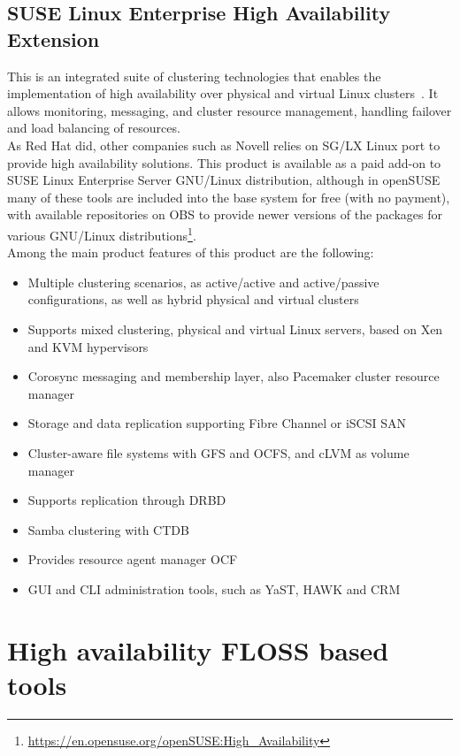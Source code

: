 \documentclass[a4paper, 12pt]{book}
\begin{document}
\subsection{SUSE Linux Enterprise High Availability Extension}
\label{subsec:suseha}

This is an integrated suite of clustering technologies that enables the implementation of high availability over physical and virtual Linux clusters~\cite{Tanja and Schraitle}. It allows monitoring, messaging, and cluster resource management, handling failover and load balancing of resources.\\

\noindent As Red Hat did, other companies such as Novell relies on SG/LX Linux port to provide high availability solutions. This product is available as a paid add-on to SUSE Linux Enterprise Server GNU/Linux distribution, although in openSUSE many of these tools are included into the base system for free (with no payment), with available repositories on OBS to provide newer versions of the packages for various GNU/Linux distributions\footnote{\url{https://en.opensuse.org/openSUSE:High_Availability}}.\\

\noindent Among the main product features of this product are the following:

\begin{itemize}
	\item Multiple clustering scenarios, as active/active and active/passive configurations, as well as hybrid physical and virtual clusters
	\item Supports mixed clustering, physical and virtual Linux servers, based on Xen and KVM hypervisors
	\item Corosync messaging and membership layer, also Pacemaker cluster resource manager
	\item Storage and data replication supporting Fibre Channel or iSCSI SAN
	\item Cluster-aware file systems with GFS and OCFS, and cLVM as volume manager
	\item Supports replication through DRBD
	\item Samba clustering with CTDB
	\item Provides resource agent manager OCF
	\item GUI and CLI administration tools, such as YaST, HAWK and CRM
\end{itemize}


\section{High availability FLOSS based tools}
\label{sec:hafloss}
\end{document}
